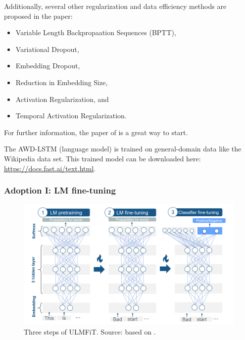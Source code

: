 \documentclass[]{krantz}
\providecommand{\tightlist}{%
  \setlength{\itemsep}{0pt}\setlength{\parskip}{0pt}}
\begin{document}
Additionally, several other regularization and data efficiency methods are proposed in the paper:

\begin{itemize}
\tightlist
\item
  Variable Length Backpropaation Sequences (BPTT),
\item
  Variational Dropout,
\item
  Embedding Dropout,
\item
  Reduction in Embedding Size,
\item
  Activation Regularization, and
\item
  Temporal Activation Regularization.
\end{itemize}

For further information, the paper of \citet{merity2017} is a great way to start.

The AWD-LSTM (language model) is trained on general-domain data like the Wikipedia data set. This trained model can be downloaded here: \url{https://docs.fast.ai/text.html}.

\hypertarget{adoption-i-lm-fine-tuning}{%
\subsubsection{Adoption I: LM fine-tuning}\label{adoption-i-lm-fine-tuning}}



\begin{figure}

{\centering \includegraphics[width=1\linewidth]{figures/02-01-transfer-learning-for-nlp-1/ulmfit-overview-new} 

}

\caption{Three steps of ULMFiT. Source: based on \citet{howardruder2018}.}\label{fig:ch21-figure03}
\end{figure}
\end{document}

